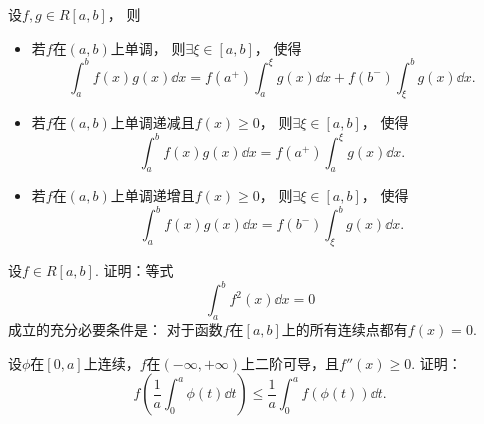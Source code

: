 \begin{theorem}[积分第二中值定理]\label{theorem:定积分.积分中值定理2}
设\(f,g \in R[a,b]\)，
则\begin{itemize}
	\item 若\(f\)在\((a,b)\)上单调，
	则\(\exists \xi \in [a,b]\)，
	使得\[
		\int_a^b f(x) g(x) \dd{x}
		= f(a^+) \int_a^{\xi} g(x) \dd{x} + f(b^-) \int_{\xi}^b g(x) \dd{x}.
	\]
	\item 若\(f\)在\((a,b)\)上单调递减且\(f(x) \geq 0\)，
	则\(\exists \xi \in [a,b]\)，
	使得\[
		\int_a^b f(x) g(x) \dd{x}
		= f(a^+) \int_a^{\xi} g(x) \dd{x}.
	\]
	\item 若\(f\)在\((a,b)\)上单调递增且\(f(x) \geq 0\)，
	则\(\exists \xi \in [a,b]\)，
	使得\[
		\int_a^b f(x) g(x) \dd{x}
		= f(b^-) \int_{\xi}^b g(x) \dd{x}.
	\]
\end{itemize}
\end{theorem}

\begin{example}
设\(f \in R[a,b]\).
证明：等式\[
	\int_a^b f^2(x) \dd{x} = 0
\]成立的充分必要条件是：
对于函数\(f\)在\([a,b]\)上的所有连续点都有\(f(x)=0\).
\end{example}

\begin{example}
设\(\phi\)在\([0,a]\)上连续，\(f\)在\((-\infty,+\infty)\)上二阶可导，且\(f''(x)\geq0\).
证明：\[
	f\left(\frac1a \int_0^a \phi(t) \dd{t}\right)
	\leq \frac1a \int_0^a f(\phi(t)) \dd{t}.
\]
\end{example}
